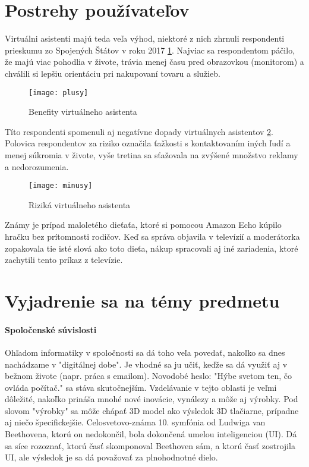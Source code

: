 \documentclass[10pt,twoside,slovak,coursepaper]{article}
\begin{document}
\section{Postrehy používateľov}
Virtuálni asistenti majú teda veľa výhod, niektoré z nich zhrnuli respondenti prieskumu zo Spojených Štátov v roku 2017 \ref{plusy}. Najviac sa respondentom páčilo, že majú viac pohodlia v živote, trávia menej času pred obrazovkou (monitorom) a chválili si lepšiu orientáciu pri nakupovaní tovaru a služieb.\cite{Nae}
\begin{figure}[H]
\centering
\texttt{[image: plusy]}
\caption{Benefity virtuálneho asistenta\cite{Nae}}
\label{plusy}
\end{figure}

Títo respondenti spomenuli aj negatívne dopady virtuálnych asistentov \ref{mínusy}. Polovica respondentov za riziko označila ťažkosti s kontaktovaním iných ľudí a menej súkromia v živote, vyše tretina sa sťažovala na zvýšené množstvo reklamy a nedorozumenia.\cite{Nae}
\begin{figure}[H]
\centering
\texttt{[image: minusy]}
\caption{Riziká virtuálneho asistenta \cite{Nae}}
\label{mínusy}
\end{figure}

Známy je prípad maloletého dieťaťa, ktoré si pomocou Amazon Echo kúpilo hračku bez prítomnosti rodičov. Keď sa správa objavila v televízií a moderátorka zopakovala tie isté slová ako toto dieťa, nákup spracovali aj iné zariadenia, ktoré zachytili tento príkaz z televízie. \cite{Nae}

\section{Vyjadrenie sa na témy predmetu}
\paragraph{Spoločenské súvislosti}
Ohľadom informatiky v spoločnosti sa dá toho veľa povedať, nakoľko sa dnes nachádzame v "digitálnej dobe". Je vhodné sa ju učiť, keďže sa dá využiť aj v bežnom živote (napr. práca s emailom). Novodobé heslo: "Hýbe svetom ten, čo ovláda počítač." sa stáva skutočnejším. Vzdelávanie v tejto oblasti je veľmi dôležité, nakoľko prináša mnohé nové inovácie, vynálezy a môže aj výrobky. Pod slovom "výrobky" sa môže chápať 3D model ako výsledok 3D tlačiarne, prípadne aj niečo špecifickejšie. Celosvetovo-známa 10. symfónia od Ludwiga van Beethovena, ktorú on nedokončil, bola dokončená umelou inteligenciou (UI). Dá sa síce rozoznať, ktorú časť skomponoval Beethoven sám, a ktorú časť zostrojila UI, ale výsledok je sa dá považovať za plnohodnotné dielo.
\end{document}
